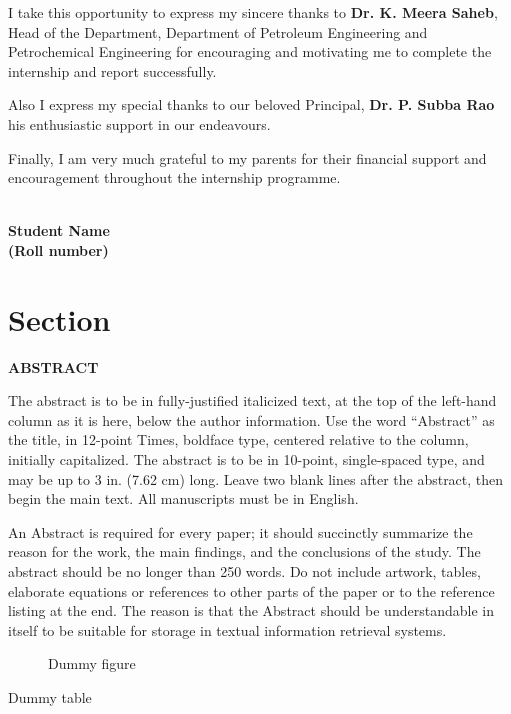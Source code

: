 \documentclass[11pt,a4paper]{article}
\begin{document}
\vspace{1em}

I take this opportunity to express my sincere thanks to \textbf{Dr. K. Meera Saheb}, Head of the Department, Department of Petroleum Engineering and Petrochemical Engineering for encouraging and motivating me to complete the internship and report successfully.

\vspace{1em}

Also I express my special thanks to our beloved Principal, \textbf{Dr. P. Subba Rao} his enthusiastic support in our endeavours.

\vspace{1em}

Finally, I am very much grateful to my parents for their financial support and encouragement throughout the internship programme.

\vspace{1em}

\textbf{\\ Student Name\\
        (Roll number)}
        
\newpage        
\tableofcontents

\section{Section}

\newpage
  
\begin{center}
      \textbf{ABSTRACT}
\end{center}
  
The abstract is to be in fully-justified italicized text, at the top of the left-hand column as it is here, below the author information. Use the word “Abstract” as the title, in 12-point Times, boldface type, centered relative to the column, initially capitalized. The abstract is to be in 10-point, single-spaced type, and may be up to 3 in. (7.62 cm) long. Leave two blank lines after the abstract, then begin the main text. All manuscripts must be in English.
  
\vspace{2em}
  
An Abstract is required for every paper; it should succinctly summarize the reason for the work, the main findings, and the conclusions of the study. The abstract should be no longer than 250 words. Do not include artwork, tables, elaborate equations or references to other parts of the paper or to the reference listing at the end. The reason is that the Abstract should be understandable in itself to be suitable for storage in textual information retrieval systems.
  
\newpage

\begin{figure}
  \caption{Dummy figure}
\end{figure}

\newpage

\begin{table}
  \caption{Dummy table}
\end{table}

\begin{appendix}

  \listoffigures
  \listoftables
  \end{appendix}  
\end{document}
